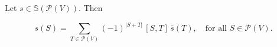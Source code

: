 Let $s \in \mathbb{S}(\mathcal{P}(V))$. Then

$$s(S) = \sum_{T \in \mathcal{P}(V)} (-1)^{|S+T|}\,[S, T]\,\bar{s}(T), \quad \text{for all } S \in \mathcal{P}(V).$$
